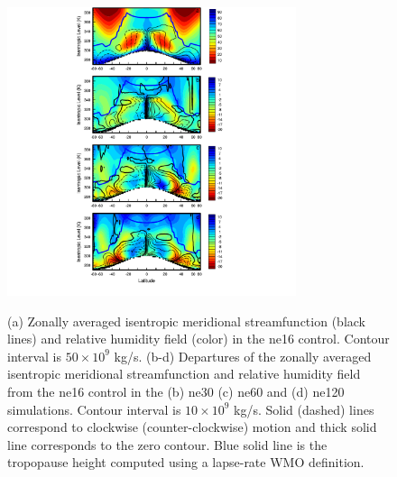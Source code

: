 \begin{figure}
\begin{center}
\noindent\includegraphics[width=20pc,angle=0]{chapter2/figure2.pdf}\\
\end{center}
\caption{(a) Zonally averaged isentropic meridional streamfunction (black lines) and relative humidity field (color) in the ne16 control. Contour interval is $50 \times 10^9$ kg/s. (b-d) Departures of the zonally averaged isentropic meridional streamfunction and relative humidity field from the ne16 control in the (b) ne30 (c) ne60 and (d) ne120 simulations. Contour interval is $10 \times 10^9$ kg/s. Solid (dashed) lines correspond to clockwise (counter-clockwise) motion and thick solid line corresponds to the zero contour. Blue solid line is the tropopause height computed using a lapse-rate WMO definition.}
\label{fig:figure2-2}
\end{figure}


